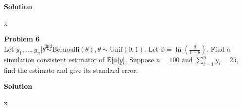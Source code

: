 \documentclass{article}
\newcommand{\ut}[1]{\underaccent{\tilde}{#1}}
\renewcommand{\vec}[1]{\ut{#1}}
\newcommand{\ind}{\stackrel{\text{ind}}{\sim}}
\newcommand{\ny}{y_1,\dots,y_n}
\newcommand{\Done}[2]{\text{#1}\left({#2}\right)}
\newcommand{\Dtwo}[3]{\text{#1}\left({#2},{#3}\right)}
\begin{document}
\vspace{\baselineskip}
\noindent
\textbf{Solution}

x

\vspace{\baselineskip}
\noindent
\Large{\textbf{Problem 6}}\normalsize
\\

Let $\ny | \theta \ind \Done{Bernoulli}{\theta}, \theta \sim \Dtwo{Unif}{0}{1}$. Let $\phi = \ln\left(\frac{\theta}{1-\theta}\right)$. Find a
simulation consistent estimator of $\mathbb{E}[\phi|\vec{y}]$. Suppose $n = 100$ and $\sum_{i=1}^n y_i =25$, find the estimate and give its standard error.


\vspace{\baselineskip}
\noindent
\textbf{Solution}

x
\end{document}
